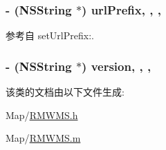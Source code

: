 \hypertarget{interface_r_m_w_m_s_aa7a542039274aa78ee1b186f56b45aa9}{
\subsubsection[{url\-Prefix}]{\setlength{\rightskip}{0pt plus 5cm}-\/ (N\-S\-String $\ast$) url\-Prefix\hspace{0.3cm}{\ttfamily [read]}, {\ttfamily [write]}, {\ttfamily [atomic]}, {\ttfamily [retain]}}}\label{interface_r_m_w_m_s_aa7a542039274aa78ee1b186f56b45aa9}


参考自 set\-Url\-Prefix\-:.

\hypertarget{interface_r_m_w_m_s_a068c53621b6a7872617d660dcdd6a260}{
\subsubsection[{version}]{\setlength{\rightskip}{0pt plus 5cm}-\/ (N\-S\-String $\ast$) version\hspace{0.3cm}{\ttfamily [read]}, {\ttfamily [write]}, {\ttfamily [atomic]}, {\ttfamily [retain]}}}\label{interface_r_m_w_m_s_a068c53621b6a7872617d660dcdd6a260}


该类的文档由以下文件生成\-:\begin{DoxyCompactItemize}
\item 
Map/\hyperlink{_r_m_w_m_s_8h}{R\-M\-W\-M\-S.\-h}\item 
Map/\hyperlink{_r_m_w_m_s_8m}{R\-M\-W\-M\-S.\-m}\end{DoxyCompactItemize}
